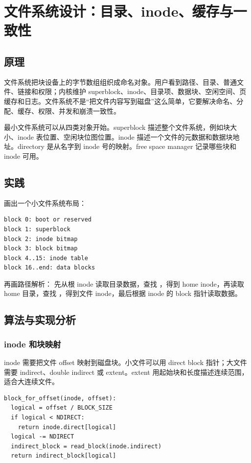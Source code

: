 \chapter{文件系统设计：目录、inode、缓存与一致性}

\section{原理}

文件系统把块设备上的字节数组组织成命名对象。用户看到路径、目录、普通文件、链接和权限；内核维护 superblock、inode、目录项、数据块、空闲空间、页缓存和日志。文件系统不是“把文件内容写到磁盘”这么简单，它要解决命名、分配、缓存、权限、并发和崩溃一致性。

最小文件系统可以从四类对象开始。superblock 描述整个文件系统，例如块大小、inode 表位置、空闲块位图位置。inode 描述一个文件的元数据和数据块地址。directory 是从名字到 inode 号的映射。free space manager 记录哪些块和 inode 可用。

\section{实践}

画出一个小文件系统布局：

\begin{lstlisting}
block 0: boot or reserved
block 1: superblock
block 2: inode bitmap
block 3: block bitmap
block 4..15: inode table
block 16..end: data blocks
\end{lstlisting}

再画路径解析： 先从根 inode 读取目录数据，查找 ，得到 home inode，再读取 home 目录，查找 ，得到文件 inode，最后根据 inode 的 block 指针读取数据。

\section{算法与实现分析}

\subsection{inode 和块映射}

inode 需要把文件 offset 映射到磁盘块。小文件可以用 direct block 指针；大文件需要 indirect、double indirect 或 extent。extent 用起始块和长度描述连续范围，适合大连续文件。

\begin{lstlisting}
block_for_offset(inode, offset):
  logical = offset / BLOCK_SIZE
  if logical < NDIRECT:
    return inode.direct[logical]
  logical -= NDIRECT
  indirect_block = read_block(inode.indirect)
  return indirect_block[logical]
\end{lstlisting}

